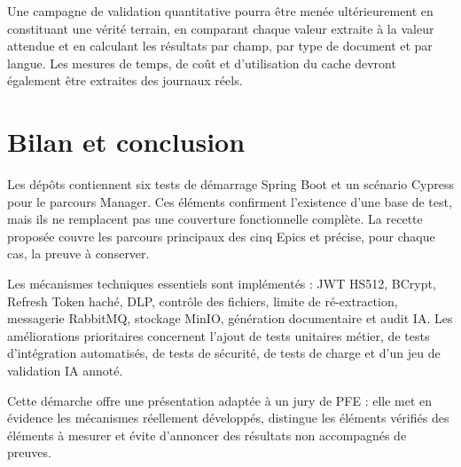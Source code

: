 Une campagne de validation quantitative pourra être menée ultérieurement en constituant une vérité terrain, en comparant chaque valeur extraite à la valeur attendue et en calculant les résultats par champ, par type de document et par langue. Les mesures de temps, de coût et d'utilisation du cache devront également être extraites des journaux réels.

\section{Bilan et conclusion}

Les dépôts contiennent six tests de démarrage Spring Boot et un scénario Cypress pour le parcours Manager. Ces éléments confirment l'existence d'une base de test, mais ils ne remplacent pas une couverture fonctionnelle complète. La recette proposée couvre les parcours principaux des cinq Epics et précise, pour chaque cas, la preuve à conserver.

Les mécanismes techniques essentiels sont implémentés : JWT HS512, BCrypt, Refresh Token haché, DLP, contrôle des fichiers, limite de ré-extraction, messagerie RabbitMQ, stockage MinIO, génération documentaire et audit IA. Les améliorations prioritaires concernent l'ajout de tests unitaires métier, de tests d'intégration automatisés, de tests de sécurité, de tests de charge et d'un jeu de validation IA annoté.

Cette démarche offre une présentation adaptée à un jury de PFE : elle met en évidence les mécanismes réellement développés, distingue les éléments vérifiés des éléments à mesurer et évite d'annoncer des résultats non accompagnés de preuves.
